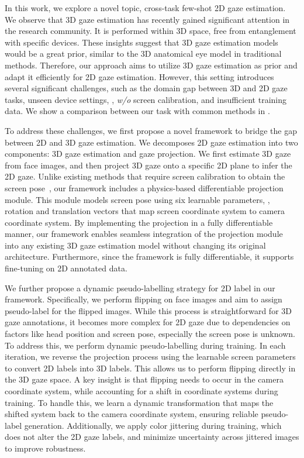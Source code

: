 In this work, we explore a novel topic, cross-task few-shot 2D gaze estimation. 
We observe that 3D gaze estimation has recently gained significant attention in the research community. It is performed within 3D space, free from entanglement with specific devices.
These insights suggest that 3D gaze estimation models would be a great prior, similar to the 3D anatomical eye model in traditional methods.
Therefore, our approach aims to utilize 3D gaze estimation as prior and adapt it efficiently for 2D gaze estimation. 
However, this setting introduces several significant challenges, such as the domain gap between 3D and 2D gaze tasks, unseen device settings, \ie, \textit{w/o} screen calibration, and insufficient training data. We show a comparison between our task with common methods in . 

To address these challenges, we first propose a novel framework to bridge the gap between 2D and 3D gaze estimation. We decomposes 2D gaze estimation into two components: 3D gaze estimation and gaze projection. 
We first estimate 3D gaze from face images, and then project 3D gaze onto a specific 2D plane to infer the 2D gaze.
Unlike existing methods that require screen calibration to obtain the screen pose~\cite{Cheng_2024_pami,Balim_2023_CVPR}, our framework includes a physics-based differentiable projection module. This module models screen pose using six learnable parameters, \ie, rotation and translation vectors that map screen coordinate system to camera coordinate system. By implementing the projection in a fully differentiable manner, our framework enables seamless integration of the projection module into any existing 3D gaze estimation model without changing its original architecture. 
Furthermore, since the framework is fully differentiable, it supports fine-tuning on 2D annotated data. 

We further propose a dynamic pseudo-labelling strategy for 2D label in our framework. 
Specifically, we perform flipping on face images and aim to assign pseudo-label for the flipped images.
While this process is straightforward for 3D gaze annotations, it becomes more complex for 2D gaze due to dependencies on factors like head position and screen pose, especially the screen pose is unknown. 
To address this, we perform dynamic pseudo-labelling during training. In each iteration, we reverse the projection process using the learnable screen parameters to convert 2D labels into 3D labels. This allows us to perform flipping directly in the 3D gaze space.
A key insight is that flipping needs to occur in the camera coordinate system, while accounting for a shift in coordinate systems during training.
To handle this, we learn a dynamic transformation that maps the shifted system back to the camera coordinate system, ensuring reliable pseudo-label generation.
Additionally, we apply color jittering during training, which does not alter the 2D gaze labels, and minimize uncertainty across jittered images to improve robustness.

